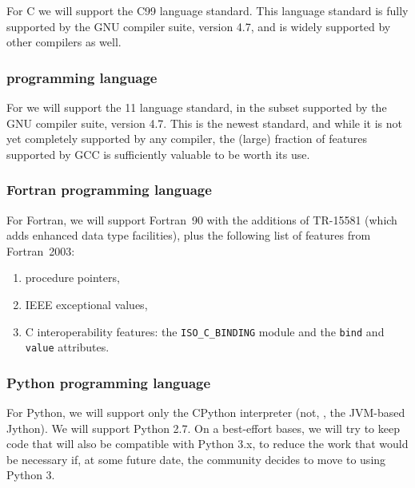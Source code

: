 \documentclass[draftmode,draftwater]{memarticle}
\begin{document}
For C we will support the C99 language standard. This language standard
is fully supported by the GNU compiler suite, version 4.7, and is widely
supported by other compilers as well.

\subsubsection{\cpp{} programming language}

For \cpp{} we will support the \cpp{}11 language standard, in the subset
supported by the GNU compiler suite, version 4.7. This is the newest
\cpp{} standard, and while it is not yet completely supported by any
compiler, the (large) fraction of features supported by GCC is
sufficiently valuable to be worth its use.

\subsubsection{Fortran programming language}

For Fortran, we will support Fortran~90 with the additions of TR-15581
(which adds enhanced data type facilities), plus the following list of
features from Fortran~2003:
\begin{enumerate}
\item procedure pointers,
\item IEEE exceptional values,
\item C interoperability features: the \texttt{ISO\_C\_BINDING} module and
  the \texttt{bind} and \texttt{value} attributes.
\end{enumerate}

\subsubsection{Python programming language}

For Python, we will support only the CPython interpreter (not, \eg, the
JVM-based Jython). We will support Python 2.7. On a best-effort bases,
we will try to keep code that will also be compatible with Python 3.x,
to reduce the work that would be necessary if, at some future date, the
community decides to move to using Python 3.


\end{document}
